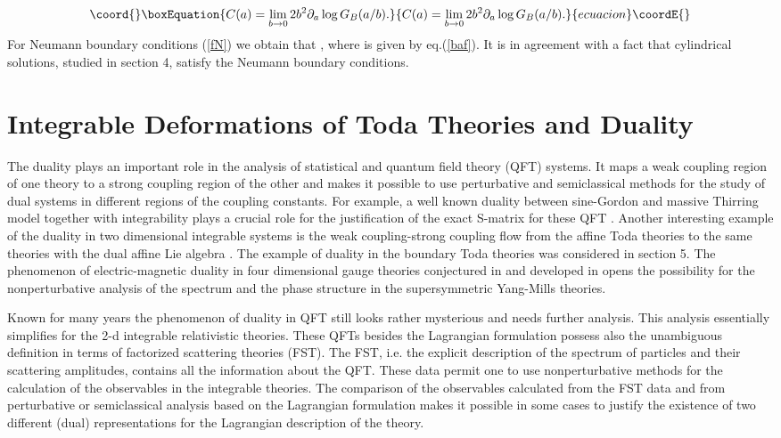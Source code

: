 \documentclass[a4paper,12pt]{article}
\begin{document}
\begin{equation}\coord{}\boxEquation{
C(a)=\lim_{b\rightarrow 0}2b^2\partial _a\log G_B(a/b).  \label{BAAS}
}{
C(a)=\lim_{b\rightarrow 0}2b^2\partial _a\log G_B(a/b).  }{ecuacion}\coordE{}\end{equation}
For Neumann boundary conditions (\ref{fN}) we obtain that \coordHE{}, 
where \coordHE{} is given by eq.(\ref{baf}). It is in agreement with a fact that
cylindrical solutions, studied in section 4, satisfy the Neumann boundary
conditions.

\section{Integrable Deformations of Toda Theories and Duality}

The duality plays an important role in the analysis of statistical and
quantum field theory (QFT) systems. It maps a weak coupling region of one
theory to a strong coupling region of the other and makes it possible to use
perturbative and semiclassical methods for the study of dual systems in
different regions of the coupling constants. For example, a well known
duality between sine-Gordon and massive Thirring model \cite{CM} together
with integrability plays a crucial role for the justification of the exact
S-matrix for these QFT . Another interesting example of the duality in two
dimensional integrable systems is the weak coupling-strong coupling flow
from the affine Toda theories to the same theories with the dual
affine Lie algebra \cite{CD}. The example of duality in the boundary Toda
theories was considered in section 5. The phenomenon of electric-magnetic
duality in four dimensional gauge theories conjectured in \cite{MNO} and
developed in \cite{SW} opens the possibility for the nonperturbative
analysis of the spectrum and the phase structure in the supersymmetric
Yang-Mills theories.

Known for many years the phenomenon of duality in QFT still looks rather
mysterious and needs further analysis. This analysis essentially simplifies
for the 2-d integrable relativistic theories. These QFTs besides the
Lagrangian formulation possess also the unambiguous definition in terms of
factorized scattering theories (FST). The FST, i.e. the explicit description
of the spectrum of particles and their scattering amplitudes, contains all
the information about the QFT. These data permit one to use nonperturbative
methods for the calculation of the observables in the integrable theories. The
comparison of the observables calculated from the FST data and from
perturbative or semiclassical analysis based on the Lagrangian formulation
makes it possible in some cases to justify the existence of two different
(dual) representations for the Lagrangian description of the theory.
\end{document}
